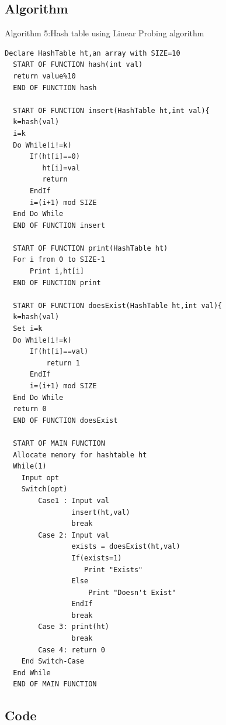 \documentclass[14pt, letterpaper]{article}
\begin{document}
\subsection{Algorithm}
\hline 
\vspace{0.1cm}
\hspace{0.5cm}Algorithm 5:Hash table using Linear Probing algorithm
\vspace{0.1cm}
\hline
\begin{lstlisting}[label={list:first}]
  Declare HashTable ht,an array with SIZE=10 
  START OF FUNCTION hash(int val)
  return value%10
  END OF FUNCTION hash
  
  START OF FUNCTION insert(HashTable ht,int val){
  k=hash(val)
  i=k
  Do While(i!=k)
      If(ht[i]==0)
         ht[i]=val
         return
      EndIf
      i=(i+1) mod SIZE
  End Do While
  END OF FUNCTION insert
  
  START OF FUNCTION print(HashTable ht)
  For i from 0 to SIZE-1
      Print i,ht[i]
  END OF FUNCTION print
  
  START OF FUNCTION doesExist(HashTable ht,int val){
  k=hash(val)
  Set i=k
  Do While(i!=k)
      If(ht[i]==val)
          return 1
      EndIf
      i=(i+1) mod SIZE
  End Do While
  return 0
  END OF FUNCTION doesExist
  
  START OF MAIN FUNCTION
  Allocate memory for hashtable ht
  While(1)
    Input opt
    Switch(opt)
        Case1 : Input val
                insert(ht,val)
                break
        Case 2: Input val
                exists = doesExist(ht,val)
                If(exists=1)
                   Print "Exists"
                Else
                    Print "Doesn't Exist"
                EndIf
                break
        Case 3: print(ht)
                break
        Case 4: return 0
    End Switch-Case
  End While
  END OF MAIN FUNCTION
\end{lstlisting}
\hline


\subsection{Code}
\end{document}
